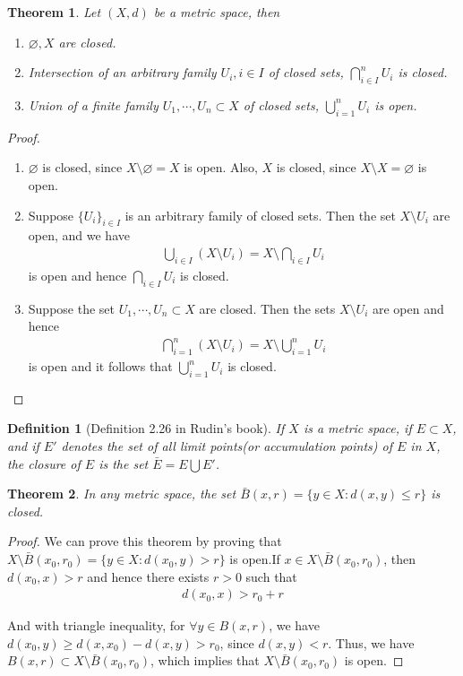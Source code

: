 \documentclass[12pt,leqno]{amsart}
\newtheorem{definition}{Definition}[section]
\newtheorem{theorem}{Theorem}[section]
\theoremstyle{definition}
\numberwithin{equation}{subsection}
\begin{document}
\medskip

\begin{theorem}
Let $(X,d)$ be a metric space, then
\begin{enumerate}
    \item $\varnothing, X$ are closed.
    \item Intersection of an arbitrary family $U_i,i\in I$ of closed sets, $\bigcap^n_{i\in I}U_i$ is closed.
    \item Union of a finite family $U_1, \cdots, U_n \subset X$ of closed sets, $\bigcup^n_{i=1}U_i$ is open.
\end{enumerate}
\end{theorem}
\begin{proof}
~\begin{enumerate}
    \item $\varnothing$ is closed, since $X\setminus \varnothing = X$ is open. Also, $X$ is closed, since $X\setminus X = \varnothing$ is open.
    \item Suppose $\{U_i\}_{i\in I}$ is an arbitrary family of closed sets. Then the set $X\setminus U_i$ are open, and we have 
    \begin{align*}
        \bigcup_{i\in I} (X\setminus U_i) = X \setminus \bigcap_{i\in I} U_i
    \end{align*}
    is open and hence $\bigcap_{i\in I} U_i$ is closed.
    \item Suppose the set $U_1, \cdots, U_n \subset X$ are closed. Then the sets $X\setminus U_i$ are open and hence
    \begin{align*}
        \bigcap^n_{i=1} (X\setminus U_i) = X \setminus \bigcup^n_{i=1} U_i
    \end{align*}
    is open and it follows that $\bigcup^n_{i=1} U_i$ is closed.
\end{enumerate}
\end{proof}

\begin{definition}[Definition 2.26 in Rudin's book]
If $X$ is a metric space, if $E\subset X$, and if $E'$ denotes the set of all limit points(or accumulation points) of $E$ in $X$, the closure of $E$ is the set $\bar{E} = E \bigcup E'$.
\end{definition}

\medskip

\begin{theorem}
In any metric space, the set $\bar{B}(x,r) = \{y\in X: d(x,y)\leq r\}$ is closed.
\end{theorem}
\begin{proof}
We can prove this theorem by proving that $X\setminus \bar{B}(x_0,r_0) = \{y\in X: d(x_0,y) > r\}$ is open.If $x\in X\setminus\bar{B}(x_0,r_0)$, then $d(x_0,x) > r$ and hence there exists $r > 0$ such that
\begin{align*}
    d(x_0,x) > r_0 + r
\end{align*}

And with triangle inequality, for $\forall y\in B(x,r)$, we have $d(x_0,y) \geq d(x,x_0) - d(x,y) > r_0$, since $d(x,y) < r$. Thus, we have $B(x,r)\subset X\setminus \bar{B}(x_0,r_0)$, which implies that $X\setminus \bar{B}(x_0,r_0)$ is open.
\end{proof}
\end{document}
